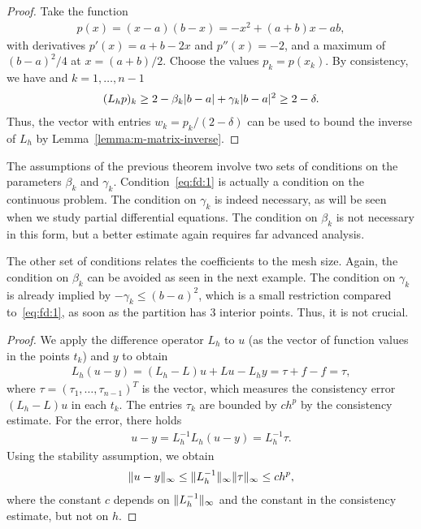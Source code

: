 

\begin{proof}
  Take the function
  \begin{gather*}
    p(x) = (x-a)(b-x) = -x^2+(a+b)x-ab,
  \end{gather*}
  with derivatives $p'(x) = a+b-2x$ and $p''(x) = -2$, and a maximum
  of $(b-a)^2/4$ at $x=(a+b)/2$. Choose the values $p_k = p(x_k)$. By
  consistency, we have and $k=1,\dots,n-1$
  \begin{gather*}
    (L_h p)_k \ge 2 - \beta_k\lvert b-a\rvert + \gamma_k \lvert b-a\rvert^2
    \ge 2-\delta.
  \end{gather*}
  Thus, the vector with entries $w_k = p_k/(2-\delta)$ can be used to
  bound the inverse of $L_h$ by Lemma~\ref{lemma:m-matrix-inverse}.
\end{proof}

\begin{remark}
  The assumptions of the previous theorem involve two sets of
  conditions on the parameters $\beta_k$ and
  $\gamma_k$. Condition~\eqref{eq:fd:1} is actually a condition on the
  continuous problem. The condition on $\gamma_k$ is indeed necessary,
  as will be seen when we study partial differential equations. The
  condition on $\beta_k$ is not necessary in this form, but a better
  estimate again requires far advanced analysis.

  The other set of conditions relates the coefficients to the mesh
  size. Again, the condition on $\beta_k$ can be avoided as seen in
  the next example. The condition on $\gamma_k$ is already implied by
  $-\gamma_k \le (b-a)^2$, which is a small restriction compared
  to~\eqref{eq:fd:1}, as soon as the partition has 3 interior
  points. Thus, it is not crucial.
\end{remark}




\begin{proof}
  We apply the difference operator $L_h$ to $u$ (as the vector of
  function values in the points $t_k$) and $y$ to obtain
  \begin{gather*}
    L_h(u-y) = (L_h - L) u + Lu - L_h y = \tau + f - f = \tau,
  \end{gather*}
  where $\tau = (\tau_1,\dots,\tau_{n-1})^T$ is the vector, which
  measures the consistency error  $(L_h-L) u$ in each $t_k$. The
  entries $\tau_k$ are bounded by $c h^p$ by the consistency estimate.
  For the error, there holds
  \begin{gather*}
    u-y = L_h^{-1} L_h(u-y) =  L_h^{-1} \tau.
  \end{gather*}
  Using the stability assumption, we obtain
  \begin{gather*}
    \lVert u-y\rVert_\infty \le \lVert L_h^{-1}\rVert_\infty \lVert\tau\rVert_\infty
    \le c h^p,
  \end{gather*}
  where the constant $c$ depends on $\lVert L_h^{-1}\rVert_\infty$ and the
  constant in the consistency estimate, but not on $h$.
\end{proof}

